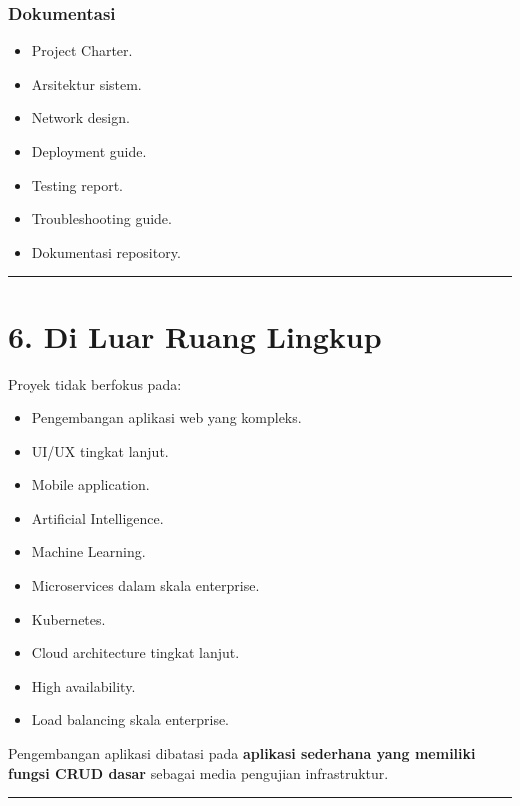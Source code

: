 \documentclass[
]{article}
\providecommand{\tightlist}{%
  \setlength{\itemsep}{0pt}\setlength{\parskip}{0pt}}
\begin{document}
\subsubsection{Dokumentasi}\label{dokumentasi}

\begin{itemize}
\tightlist
\item
  Project Charter.
\item
  Arsitektur sistem.
\item
  Network design.
\item
  Deployment guide.
\item
  Testing report.
\item
  Troubleshooting guide.
\item
  Dokumentasi repository.
\end{itemize}

\begin{center}\rule{0.5\linewidth}{0.5pt}\end{center}

\section{6. Di Luar Ruang Lingkup}\label{di-luar-ruang-lingkup}

Proyek tidak berfokus pada:

\begin{itemize}
\tightlist
\item
  Pengembangan aplikasi web yang kompleks.
\item
  UI/UX tingkat lanjut.
\item
  Mobile application.
\item
  Artificial Intelligence.
\item
  Machine Learning.
\item
  Microservices dalam skala enterprise.
\item
  Kubernetes.
\item
  Cloud architecture tingkat lanjut.
\item
  High availability.
\item
  Load balancing skala enterprise.
\end{itemize}

Pengembangan aplikasi dibatasi pada \textbf{aplikasi sederhana yang
memiliki fungsi CRUD dasar} sebagai media pengujian infrastruktur.

\begin{center}\rule{0.5\linewidth}{0.5pt}\end{center}
\end{document}
